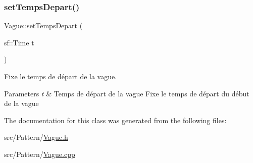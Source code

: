 \mbox{\label{class_vague_a9162962646b70286b2710391c33bcc88}} 
\subsubsection{\texorpdfstring{set\+Temps\+Depart()}{setTempsDepart()}}
{\footnotesize\ttfamily Vague\+::set\+Temps\+Depart (\begin{DoxyParamCaption}\item[{sf\+::\+Time}]{t }\end{DoxyParamCaption})\hspace{0.3cm}{\ttfamily [inline]}}



Fixe le temps de départ de la vague. 


\begin{DoxyParams}{Parameters}
{\em t} & Temps de départ de la vague Fixe le temps de départ du début de la vague \\
\hline
\end{DoxyParams}


The documentation for this class was generated from the following files\+:\begin{DoxyCompactItemize}
\item 
src/\+Pattern/\mbox{\hyperlink{_vague_8h}{Vague.\+h}}\item 
src/\+Pattern/\mbox{\hyperlink{_vague_8cpp}{Vague.\+cpp}}\end{DoxyCompactItemize}
